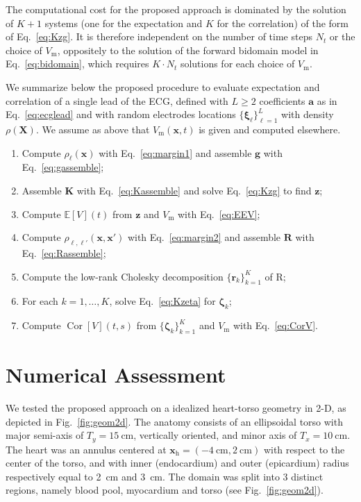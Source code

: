 \documentclass[runningheads]{llncs}
\newcommand{\bs}[1]{\boldsymbol{#1}}
\newcommand{\Vm}{V_\mathrm{m}}
\newcommand{\vX}{\mathbf{X}}
\newcommand{\vx}{\mathbf{x}}
\newcommand{\EE}{\mathbb{E}}
\DeclareMathOperator{\Cor}{Cor}
\begin{document}
The computational cost for the proposed approach is dominated
by the solution of $K+1$
systems (one for the expectation and $K$ for the correlation)
of the form of Eq.~\eqref{eq:Kzg}. It is therefore
independent on the number of time steps $N_t$ or the choice
of $\Vm$, oppositely to the
solution of the forward bidomain model in Eq.~\eqref{eq:bidomain},
which requires $K\cdot N_t$ solutions for each choice of $\Vm$.

We summarize below the proposed procedure to evaluate expectation and correlation of a single lead
of the ECG, defined with $L \ge 2$ coefficients $\mathbf{a}$
as in Eq.~\eqref{eq:ecglead} and with random electrodes locations
$\{ \bs\xi_\ell \}_{\ell=1}^L$
with density $\rho(\vX)$. We assume as above that $\Vm(\vx,t)$ is given
and computed elsewhere.
\begin{enumerate}
\item Compute $\rho_\ell(\vx)$ with Eq.~\eqref{eq:margin1} and assemble $\mathbf{g}$ with Eq.~\eqref{eq:gassemble};
\item Assemble $\mathbf{K}$ with Eq.~\eqref{eq:Kassemble} and solve Eq.~\eqref{eq:Kzg} to find $\mathbf{z}$;
\item Compute $\EE[V](t)$ from $\mathbf{z}$ and $\Vm$ with Eq.~\eqref{eq:EEV};
\item Compute $\rho_{\ell,\ell'}(\vx,\vx')$ with Eq.~\eqref{eq:margin2} and assemble $\mathbf{R}$ with Eq.~\eqref{eq:Rassemble};
\item Compute the low-rank Cholesky decomposition $\{ \bs{r}_k \}_{k=1}^K$ of $\mathrm{R}$;
\item For each $k=1,\ldots,K$, solve Eq.~\eqref{eq:Kzeta} for $\bs\zeta_k$;
\item Compute $\Cor[V](t,s)$ from $\{ \bs{\zeta}_k \}_{k=1}^K$ and $\Vm$ with Eq.~\eqref{eq:CorV}.
\end{enumerate}

\section{Numerical Assessment}
\label{sec:exp}

We tested the proposed approach on a idealized heart-torso geometry in
2-D, as depicted in Fig.~\ref{fig:geom2d}.  The anatomy consists of an
ellipsoidal torso with major semi-axis of $T_y = \SI{15}{\cm}$, vertically oriented,
and minor axis of $T_x = \SI{10}{\cm}$.  The heart was an annulus centered at
$\vx_\mathrm{h}=(\SI{-4}{\cm}, \SI{2}{\cm})$ with respect to the center of the torso,
and with inner (endocardium) and outer (epicardium) radius respectively
equal to \SI{2}{\cm} and \SI{3}{\cm}.  The domain was split into 3 distinct
regions, namely blood pool, myocardium and torso (see Fig.~\ref{fig:geom2d}).
\end{document}

